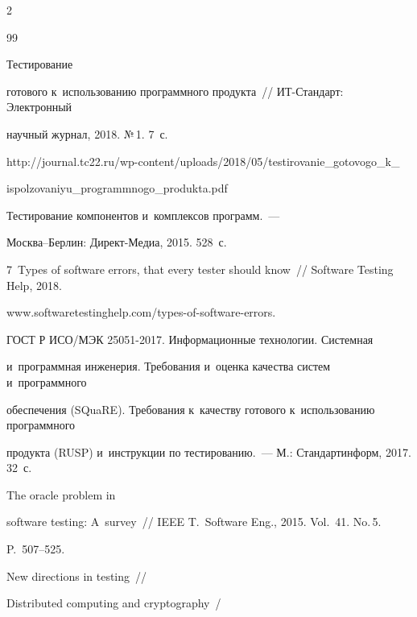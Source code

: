 \begin{multicols}{2}
{{\begin{thebibliography}{99}


      Тестирование 


готового к~использованию про\-грам\-много продукта~// ИТ-Стан\-дарт: Электронный 


научный журнал, 2018. №\,1. 7~с.


{\sf  


http://journal.tc22.ru/\linebreak wp-content/uploads/2018/05/testirovanie\_gotovogo\_k\_\linebreak 


ispolzovaniyu\_programmnogo\_produkta.pdf}




      Тестирование компонентов и~комплексов программ.~---  


Москва--Берлин: Директ-Медиа, 2015. 528~с.




     7~Types of software errors, that every tester should know~// Software Testing Help, 2018. 


{\sf www.softwaretestinghelp.\linebreak com/types-of-software-errors}.







     ГОСТ Р ИСО/МЭК 25051-2017. Информационные технологии. Системная 


и~программная инженерия. Требования и~оценка качества систем и~программно\-го 


обеспечения (SQuaRE). Требования к~качеству готового к~использованию программного 


продукта (RUSP) и~инструкции по тестированию.~--- М.: Стандартинформ, 2017. 32~с.




      The oracle problem in 


software testing: A~survey~// IEEE T.~Software Eng., 2015. Vol.~41. No.\,5.  


P.~507--525.




      New directions in testing~// 


      Distributed computing and cryptography~/



\end{thebibliography}}}
\end{multicols}
